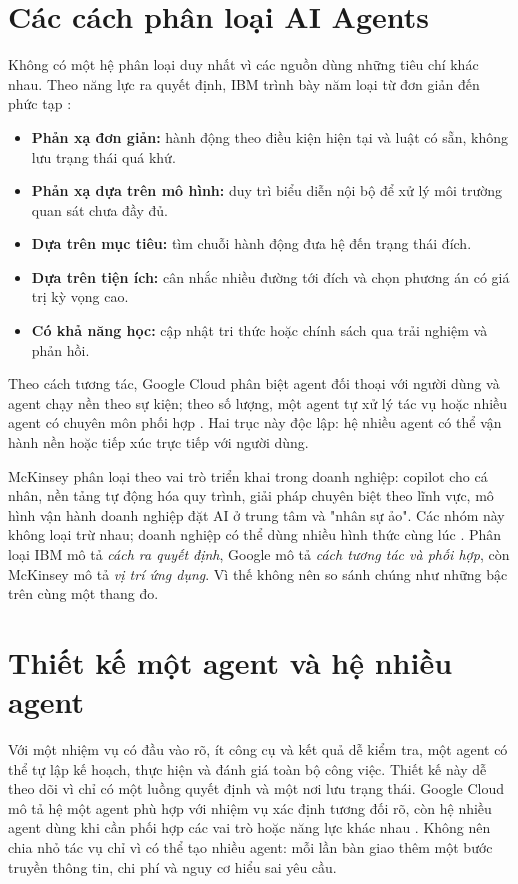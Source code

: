 \documentclass[12pt,a4paper]{report}
\begin{document}
\section{Các cách phân loại AI Agents}
Không có một hệ phân loại duy nhất vì các nguồn dùng những tiêu chí khác nhau.
Theo năng lực ra quyết định, IBM trình bày năm loại từ đơn giản đến phức tạp
\cite{ibm}:
\begin{itemize}
\item \textbf{Phản xạ đơn giản:} hành động theo điều kiện hiện tại và luật có sẵn, không lưu trạng thái quá khứ.
\item \textbf{Phản xạ dựa trên mô hình:} duy trì biểu diễn nội bộ để xử lý môi trường quan sát chưa đầy đủ.
\item \textbf{Dựa trên mục tiêu:} tìm chuỗi hành động đưa hệ đến trạng thái đích.
\item \textbf{Dựa trên tiện ích:} cân nhắc nhiều đường tới đích và chọn phương án có giá trị kỳ vọng cao.
\item \textbf{Có khả năng học:} cập nhật tri thức hoặc chính sách qua trải nghiệm và phản hồi.
\end{itemize}

Theo cách tương tác, Google Cloud phân biệt agent đối thoại với người dùng và agent
chạy nền theo sự kiện; theo số lượng, một agent tự xử lý tác vụ hoặc nhiều agent có
chuyên môn phối hợp \cite{google}. Hai trục này độc lập: hệ nhiều agent có thể vận
hành nền hoặc tiếp xúc trực tiếp với người dùng.

McKinsey phân loại theo vai trò triển khai trong doanh nghiệp: copilot cho cá nhân,
nền tảng tự động hóa quy trình, giải pháp chuyên biệt theo lĩnh vực, mô hình vận hành
doanh nghiệp đặt AI ở trung tâm và "nhân sự ảo". Các nhóm này không loại trừ nhau;
doanh nghiệp có thể dùng nhiều hình thức cùng lúc \cite{mckinsey}. Phân loại IBM mô
tả \emph{cách ra quyết định}, Google mô tả \emph{cách tương tác và phối hợp}, còn
McKinsey mô tả \emph{vị trí ứng dụng}. Vì thế không nên so sánh chúng như những bậc
trên cùng một thang đo.

\section{Thiết kế một agent và hệ nhiều agent}
Với một nhiệm vụ có đầu vào rõ, ít công cụ và kết quả dễ kiểm tra, một agent có thể
tự lập kế hoạch, thực hiện và đánh giá toàn bộ công việc. Thiết kế này dễ theo dõi
vì chỉ có một luồng quyết định và một nơi lưu trạng thái. Google Cloud mô tả hệ một
agent phù hợp với nhiệm vụ xác định tương đối rõ, còn hệ nhiều agent dùng khi cần
phối hợp các vai trò hoặc năng lực khác nhau \cite{google}. Không nên chia nhỏ tác
vụ chỉ vì có thể tạo nhiều agent: mỗi lần bàn giao thêm một bước truyền thông tin,
chi phí và nguy cơ hiểu sai yêu cầu.
\end{document}
